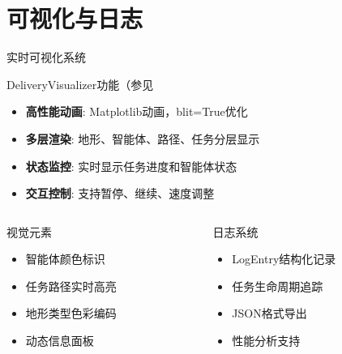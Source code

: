 \documentclass[
10pt,
aspectratio=169,
]{beamer}
\begin{document}
\section{可视化与日志}

\begin{frame}{实时可视化系统}
    \begin{block}{DeliveryVisualizer功能（参见}%
        \begin{itemize}
            \item \textbf{高性能动画}: Matplotlib动画，blit=True优化
            \item \textbf{多层渲染}: 地形、智能体、路径、任务分层显示
            \item \textbf{状态监控}: 实时显示任务进度和智能体状态
            \item \textbf{交互控制}: 支持暂停、继续、速度调整
        \end{itemize}
    \end{block}
    
    \begin{columns}
        \begin{column}{0.5\textwidth}
            \begin{exampleblock}{视觉元素}
                \begin{itemize}
                    \item 智能体颜色标识
                    \item 任务路径实时高亮
                    \item 地形类型色彩编码
                    \item 动态信息面板
                \end{itemize}
            \end{exampleblock}
        \end{column}
        \begin{column}{0.5\textwidth}
            \begin{alertblock}{日志系统}
                \begin{itemize}
                    \item LogEntry结构化记录
                    \item 任务生命周期追踪
                    \item JSON格式导出
                    \item 性能分析支持
                \end{itemize}
            \end{alertblock}
        \end{column}
    \end{columns}
\end{frame}
\end{document}
